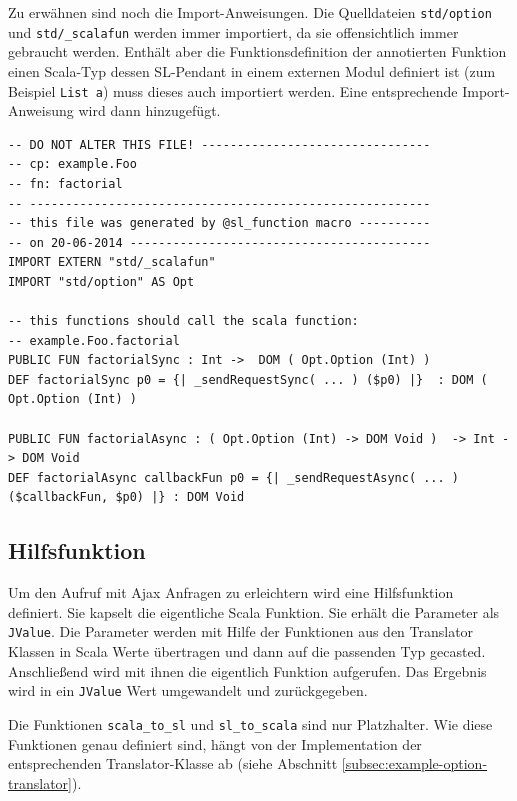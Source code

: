 \documentclass[12pt,bibtotoc]{scrreprt}
\begin{document}
Zu erwähnen sind noch die Import-Anweisungen. Die Quelldateien \lstinline!std/option! und \lstinline!std/_scalafun! werden immer importiert, da sie offensichtlich immer gebraucht werden. Enthält aber die Funktionsdefinition der annotierten Funktion einen Scala-Typ dessen SL-Pendant in einem externen Modul definiert ist (zum Beispiel \lstinline!List a!) muss dieses auch importiert werden. Eine entsprechende Import-Anweisung wird dann hinzugefügt.

\begin{lstlisting}[caption=SL-Modul factorial.sl zur Funktion aus Listing \ref{lst:example-function}, label=lst:example-sl-modul, float=h]
-- DO NOT ALTER THIS FILE! --------------------------------
-- cp: example.Foo
-- fn: factorial
-- --------------------------------------------------------
-- this file was generated by @sl_function macro ----------
-- on 20-06-2014 ------------------------------------------
IMPORT EXTERN "std/_scalafun"
IMPORT "std/option" AS Opt

-- this functions should call the scala function:
-- example.Foo.factorial
PUBLIC FUN factorialSync : Int ->  DOM ( Opt.Option (Int) )
DEF factorialSync p0 = {| _sendRequestSync( ... ) ($p0) |}  : DOM ( Opt.Option (Int) )

PUBLIC FUN factorialAsync : ( Opt.Option (Int) -> DOM Void )  -> Int -> DOM Void
DEF factorialAsync callbackFun p0 = {| _sendRequestAsync( ... )  ($callbackFun, $p0) |} : DOM Void
\end{lstlisting}

\subsection{Hilfsfunktion}
\label{subsec:helperfunction}

Um den Aufruf mit Ajax Anfragen zu erleichtern wird eine Hilfsfunktion definiert. Sie kapselt die eigentliche Scala Funktion. Sie erhält die Parameter als \lstinline!JValue!. Die Parameter werden mit Hilfe der Funktionen aus den Translator Klassen in Scala Werte übertragen und dann auf die passenden Typ gecasted. Anschließend wird mit ihnen die eigentlich Funktion aufgerufen. Das Ergebnis wird in ein \lstinline!JValue! Wert umgewandelt und zurückgegeben.

Die Funktionen \lstinline!scala_to_sl! und \lstinline!sl_to_scala! sind nur Platzhalter. Wie diese Funktionen genau definiert sind, hängt von der Implementation der entsprechenden Translator-Klasse ab (siehe Abschnitt \ref{subsec:example-option-translator}).
\end{document}
